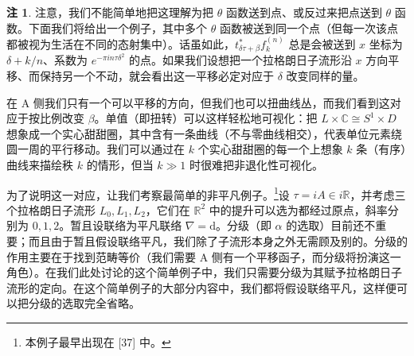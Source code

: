 \documentclass[11pt,a4paper]{article}
\theoremstyle{plain}
\theoremstyle{definition}
\newtheorem{remark}[theorem]{注}
\begin{document}
\begin{remark}
注意，我们不能简单地把这理解为把 $\theta$ 函数送到点、或反过来把点送到 $\theta$ 函数。下面我们将给出一个例子，其中多个 $\theta$ 函数被送到同一个点（但每一次该点都被视为生活在不同的态射集中）。话虽如此，$t^*_{\delta\tau+\beta}f_k^{(n)}$ 总是会被送到 $x$ 坐标为 $\delta+k/n$、系数为 $e^{-\pi in\tau\delta^2}$ 的点。如果我们设想把一个拉格朗日子流形沿 $x$ 方向平移、而保持另一个不动，就会看出这一平移必定对应于 $\delta$ 改变同样的量。
\end{remark}


在 A 侧我们只有一个可以平移的方向，但我们也可以扭曲线丛，而我们看到这对应于按比例改变 $\beta$。单值（即扭转）可以这样轻松地可视化：把 $L\times\mathbb{C}\cong S^1\times D$ 想象成一个实心甜甜圈，其中含有一条曲线（不与零曲线相交），代表单位元素绕圆一周的平行移动。我们可以通过在 $k$ 个实心甜甜圈的每一个上想象 $k$ 条（有序）曲线来描绘秩 $k$ 的情形，但当 $k\gg1$ 时很难把非退化性可视化。

为了说明这一对应，让我们考察最简单的非平凡例子。\footnote{本例子最早出现在 [37] 中。}设 $\tau=iA\in i\mathbb{R}$，并考虑三个拉格朗日子流形 $L_0,L_1,L_2$，它们在 $\mathbb{R}^2$ 中的提升可以选为都经过原点，斜率分别为 $0,1,2$。暂且设联络为平凡联络 $\nabla=\mathrm{d}$。分级（即 $\alpha$ 的选取）目前还不重要；而且由于暂且假设联络平凡，我们除了子流形本身之外无需顾及别的。分级的作用主要在于找到范畴等价（我们需要 A 侧有一个平移函子，而分级将扮演这一角色）。在我们此处讨论的这个简单例子中，我们只需要分级为其赋予拉格朗日子流形的定向。在这个简单例子的大部分内容中，我们都将假设联络平凡，这样便可以把分级的选取完全省略。

\end{document}
